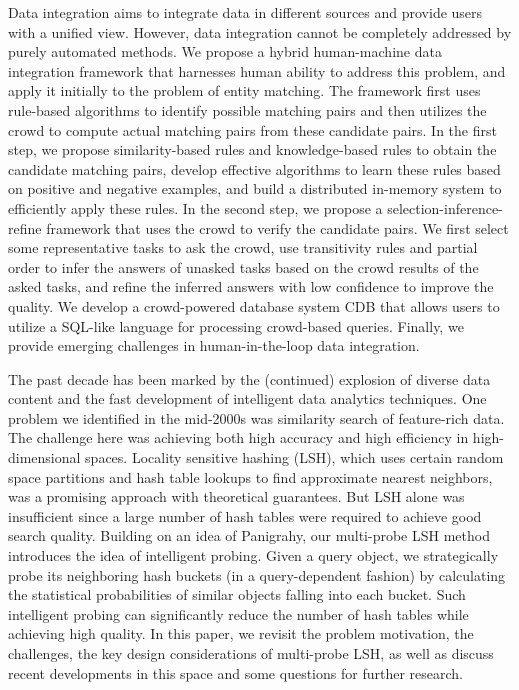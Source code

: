 Data integration aims to integrate data in different sources and provide users with a unified view. However, data integration cannot be completely addressed by purely automated methods. We propose a hybrid human-machine data integration framework that harnesses human ability to address this problem, and apply it initially to the problem of entity matching. The framework first uses rule-based algorithms to identify possible matching pairs and then utilizes the crowd to compute actual matching pairs from these candidate pairs. In the first step, we propose similarity-based rules and knowledge-based rules to obtain the candidate matching pairs, develop effective algorithms to learn these rules based on positive and negative examples, and build a distributed in-memory system to efficiently apply these rules. In the second step, we propose a selection-inference-refine framework that uses the crowd to verify the candidate pairs. We first select some representative tasks to ask the crowd, use transitivity rules and partial order to infer the answers of unasked tasks based on the crowd results of the asked tasks, and refine the inferred answers with low confidence to improve the quality. We develop a crowd-powered database system CDB that allows users to utilize a SQL-like language for processing crowd-based queries. Finally, we provide emerging challenges in human-in-the-loop data integration. 


The past decade has been marked by the (continued) explosion of diverse data content and the fast development of intelligent data analytics techniques. One problem we identified in the mid-2000s was similarity search of feature-rich data. The challenge here was achieving both high accuracy and high efficiency in high-dimensional spaces. Locality sensitive hashing (LSH), which uses certain random space partitions and hash table lookups to find approximate nearest neighbors, was a promising approach with theoretical guarantees. But LSH alone was insufficient since a large number of hash tables were required to achieve good search quality. Building on an idea of Panigrahy, our multi-probe LSH method introduces the idea of intelligent probing. Given a query object, we strategically probe its neighboring hash buckets (in a query-dependent fashion) by calculating the statistical probabilities of similar objects falling into each bucket. Such intelligent probing can significantly reduce the number of hash tables while achieving high quality. In this paper, we revisit the problem motivation, the challenges, the key design considerations of multi-probe LSH, as well as discuss recent developments in this space and some questions for further research.

